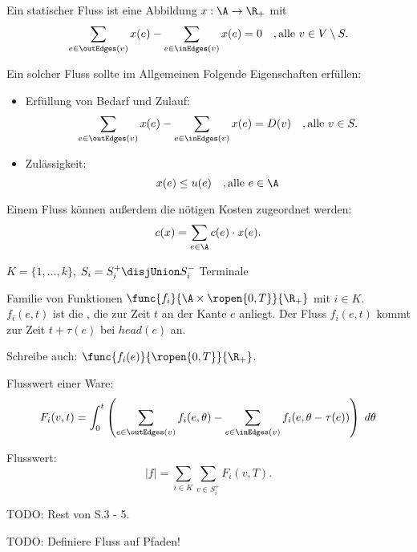 \begin{definition}
    Ein statischer Fluss ist eine Abbildung $x : \A \rightarrow \R_+$ mit
    \[ \sum_{e \in \outEdges(v)} x(e) - \sum_{e \in \inEdges(v)} x(e) = 0 \quad, \text{alle } v \in V \setminus S. \]

    Ein solcher Fluss sollte im Allgemeinen Folgende Eigenschaften erfüllen:
    \begin{itemize}
        \item Erfüllung von Bedarf und Zulauf:
            \[ \sum_{e \in \outEdges(v)} x(e) - \sum_{e \in \inEdges(v)} x(e) = D(v) \quad, \text{alle } v \in S. \]
        \item Zulässigkeit:
            \[ x(e) \leq u(e) \quad, \text{alle } e \in \A \]
    \end{itemize}

    Einem Fluss können außerdem die nötigen Kosten zugeordnet werden:
        \[ c(x) = \sum_{e \in \A} c(e) \cdot x(e). \]
\end{definition}

\begin{definition}
    $K = \{1, \ldots, k\}$, $S_i = S_i^+ \disjUnion S_i^-$ Terminale
\end{definition}

\begin{definition}
    Familie von Funktionen $\func{f_i}{\A \times \ropen{0,T}}{\R_+}$ mit $i \in K$.
    $f_i(e,t)$ ist die , die zur Zeit $t$ an der Kante $e$ anliegt.
    Der Fluss $f_i(e,t)$ kommt zur Zeit $t + \tau(e)$ bei $head(e)$ an.

    Schreibe auch: $\func{f_i(e)}{\ropen{0,T}}{\R_+}$.

    Flusswert einer Ware:
    \[
        F_i(v, t) =
            \int_0^t \left(
                \sum_{e \in \outEdges(v)} f_i(e, \theta) -
                \sum_{e \in \inEdges(v)} f_i(e, \theta - \tau(e)) \right) \;d\theta
    \]

    Flusswert:
    \[
        |f| = \sum_{i \in K} \sum_{v \in S_i^+} F_i(v,T).
    \]

    TODO: Rest von S.3 - 5.
\end{definition}


TODO: Definiere Fluss auf Pfaden!
